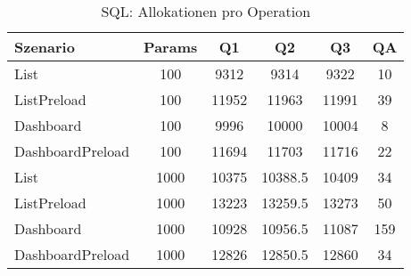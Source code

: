\begin{table}[ht]
\centering
\caption{SQL: Allokationen pro Operation}
\begin{tabular}{lccccc}
\toprule
Szenario & Params & Q1 & Q2 & Q3 & QA \\
\midrule
	List & 100 & 9312 & 9314 & 9322 & 10 \\
	ListPreload & 100 & 11952 & 11963 & 11991 & 39 \\
	Dashboard & 100 & 9996 & 10000 & 10004 & 8 \\
	DashboardPreload & 100 & 11694 & 11703 & 11716 & 22 \\
	List & 1000 & 10375 & 10388.5 & 10409 & 34 \\
	ListPreload & 1000 & 13223 & 13259.5 & 13273 & 50 \\
	Dashboard & 1000 & 10928 & 10956.5 & 11087 & 159 \\
	DashboardPreload & 1000 & 12826 & 12850.5 & 12860 & 34 \\
\bottomrule
\end{tabular}
\label{tab:benchmark_sql_allocsperop}
\end{table}
	